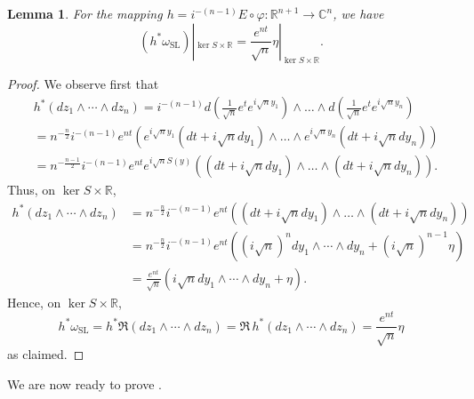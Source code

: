 \documentclass[a4paper,leqno,11pt]{amsart}
\numberwithin{equation}{section}
\newtheorem{lemma}[theorem]{Lemma}
\theoremstyle{remark}
\theoremstyle{remark}
\newcommand{\R}{\mathbb{R}}
\newcommand{\C}{\mathbb{C}}
\newcommand{\SL}{\mathrm{SL}}
\begin{document}
\begin{lemma}
\label{lemma:SL-h-properties}
For the mapping $h = i^{-(n-1)} E\circ \varphi \colon \R^{n+1} \to \C^n$, we have
\[
(h^*\omega_\SL)|_{\ker S\times \R} = \frac{e^{nt}}{\sqrt{n}} \eta|_{\ker S \times \R}.
\]
\end{lemma}
\begin{proof}
We observe first that
\begin{align*}
&h^{*}(dz_1 \wedge \cdots \wedge dz_n) = i^{ -(n-1) } d\left( \frac{1}{\sqrt{n}} e^t e^{i\sqrt{n}y_1} \right) \wedge \dots \wedge d\left( \frac{1}{\sqrt{n}} e^{t} e^{i\sqrt{n}y_n } \right) \\
&= n^{ -\frac{n}{2} } i^{ -(n-1) } e^{nt} \left( e^{i\sqrt{n}y_1} ( dt + i \sqrt{n}  dy_1 ) \wedge \dots \wedge e^{i\sqrt{n}y_n}( dt + i \sqrt{n} dy_n ) \right) \\
&= n^{ -\frac{n-1}{2} } i^{ -(n-1) } e^{nt} e^{i\sqrt{n} S(y)} \left( ( dt + i \sqrt{n}  dy_1 ) \wedge \dots \wedge ( dt + i \sqrt{n} dy_n ) \right).
\end{align*}
Thus, on $\ker S\times \R$, 
\begin{align*}
h^*(dz_1 \wedge \cdots \wedge dz_n)
&= n^{ -\frac{n}{2} } i^{ -(n-1) } e^{nt} \left( ( dt + i \sqrt{n}  dy_1 ) \wedge \dots \wedge ( dt + i \sqrt{n} dy_n ) \right) \\
&= n^{ -\frac{n}{2} } i^{ -(n-1) } e^{nt} \left( (i\sqrt{n})^n dy_1\wedge \cdots \wedge dy_n + (i\sqrt{n})^{n-1} \eta\right)\\
&= \frac{e^{nt}}{\sqrt{n}} \left( i\sqrt{n} dy_1\wedge \cdots \wedge dy_n + \eta\right).
\end{align*}
Hence, on $\ker S\times \R$, 
\[
h^*\omega_\SL = h^*\Re (dz_1 \wedge \cdots \wedge dz_n) = \Re\, h^*(dz_1 \wedge \cdots \wedge dz_n) = \frac{e^{nt}}{\sqrt{n}} \eta
\]
as claimed.
\end{proof}

We are now ready to prove .
\end{document}
